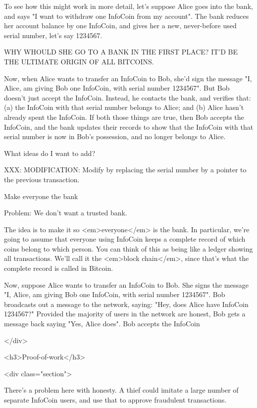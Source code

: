 To see how this might work in more detail, let's suppose Alice goes
into the bank, and says "I want to withdraw one InfoCoin from my
account".  The bank reduces her account balance by one InfoCoin, and
gives her a new, never-before used serial number, let's say 1234567.

WHY WHOULD SHE GO TO A BANK IN THE FIRST PLACE?  IT'D BE THE ULTIMATE
ORIGIN OF ALL BITCOINS.

Now, when Alice wants to transfer an InfoCoin to Bob, she'd sign the
message "I, Alice, am giving Bob one InfoCoin, with serial number
1234567".  But Bob doesn't just accept the InfoCoin.  Instead, he
contacts the bank, and verifies that: (a) the InfoCoin with that
serial number belongs to Alice; and (b) Alice hasn't already spent the
InfoCoin.  If both those things are true, then Bob accepts the
InfoCoin, and the bank updates their records to show that the InfoCoin
with that serial number is now in Bob's possession, and no longer
belongs to Alice.





What ideas do I want to add?


XXX: MODIFICATION: Modify by replacing the serial number by a pointer
to the previous transaction.


Make everyone the bank

Problem: We don't want a trusted bank.

The idea is to make it so <em>everyone</em> is the bank.  In
particular, we're going to assume that everyone using InfoCoin keeps a
complete record of which coins belong to which person.  You can think
of this as being like a ledger showing all transactions.  We'll call
it the <em>block chain</em>, since that's what the complete record is
called in Bitcoin.

Now, suppose Alice wants to transfer an InfoCoin to Bob.  She signs
the message "I, Alice, am giving Bob one InfoCoin, with serial number
1234567".  Bob broadcasts out a message to the network, saying: "Hey,
does Alice have InfoCoin 1234567?"  Provided the majority of users in
the network are honest, Bob gets a message back saying "Yes, Alice
does".  Bob accepts the InfoCoin

</div>

<h3>Proof-of-work</h3>

<div class="section">

There's a problem here with honesty.  A thief could imitate a large
number of separate InfoCoin users, and use that to approve fraudulent
transactions.  

